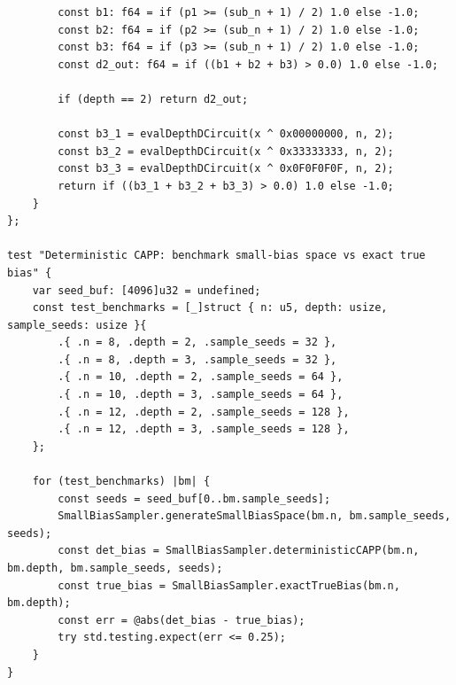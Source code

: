 \documentclass[11pt,a4paper]{article}
\theoremstyle{definition}
\theoremstyle{remark}
\begin{document}
\begin{lstlisting}
        const b1: f64 = if (p1 >= (sub_n + 1) / 2) 1.0 else -1.0;
        const b2: f64 = if (p2 >= (sub_n + 1) / 2) 1.0 else -1.0;
        const b3: f64 = if (p3 >= (sub_n + 1) / 2) 1.0 else -1.0;
        const d2_out: f64 = if ((b1 + b2 + b3) > 0.0) 1.0 else -1.0;

        if (depth == 2) return d2_out;

        const b3_1 = evalDepthDCircuit(x ^ 0x00000000, n, 2);
        const b3_2 = evalDepthDCircuit(x ^ 0x33333333, n, 2);
        const b3_3 = evalDepthDCircuit(x ^ 0x0F0F0F0F, n, 2);
        return if ((b3_1 + b3_2 + b3_3) > 0.0) 1.0 else -1.0;
    }
};

test "Deterministic CAPP: benchmark small-bias space vs exact true bias" {
    var seed_buf: [4096]u32 = undefined;
    const test_benchmarks = [_]struct { n: u5, depth: usize, sample_seeds: usize }{
        .{ .n = 8, .depth = 2, .sample_seeds = 32 },
        .{ .n = 8, .depth = 3, .sample_seeds = 32 },
        .{ .n = 10, .depth = 2, .sample_seeds = 64 },
        .{ .n = 10, .depth = 3, .sample_seeds = 64 },
        .{ .n = 12, .depth = 2, .sample_seeds = 128 },
        .{ .n = 12, .depth = 3, .sample_seeds = 128 },
    };

    for (test_benchmarks) |bm| {
        const seeds = seed_buf[0..bm.sample_seeds];
        SmallBiasSampler.generateSmallBiasSpace(bm.n, bm.sample_seeds, seeds);
        const det_bias = SmallBiasSampler.deterministicCAPP(bm.n, bm.depth, bm.sample_seeds, seeds);
        const true_bias = SmallBiasSampler.exactTrueBias(bm.n, bm.depth);
        const err = @abs(det_bias - true_bias);
        try std.testing.expect(err <= 0.25);
    }
}
\end{lstlisting}
\end{document}
